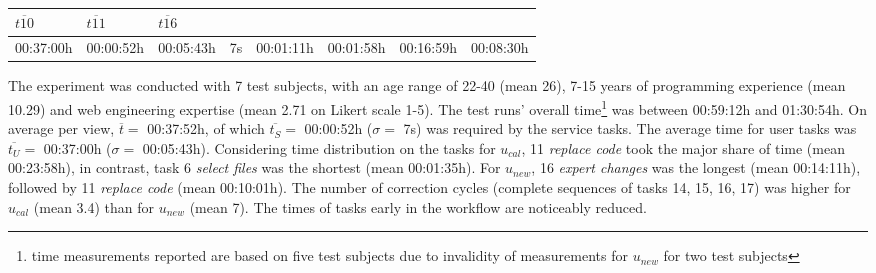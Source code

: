 \begin{longtable}[]{@{}llllllll@{}}
\begin{minipage}[b]{0.10\columnwidth}
\(\overline{t10}\)\strut
\end{minipage} & \begin{minipage}[b]{0.10\columnwidth}\raggedright
\(\overline{t11}\)\strut
\end{minipage} & \begin{minipage}[b]{0.10\columnwidth}\raggedright
\(\overline{t16}\)\strut
\end{minipage}\tabularnewline
\midrule
\endhead
\begin{minipage}[t]{0.10\columnwidth}\raggedright
00:37:00h\strut
\end{minipage} & \begin{minipage}[t]{0.10\columnwidth}\raggedright
00:00:52h\strut
\end{minipage} & \begin{minipage}[t]{0.08\columnwidth}\raggedright
00:05:43h\strut
\end{minipage} & \begin{minipage}[t]{0.08\columnwidth}\raggedright
7s\strut
\end{minipage} & \begin{minipage}[t]{0.10\columnwidth}\raggedright
00:01:11h\strut
\end{minipage} & \begin{minipage}[t]{0.10\columnwidth}\raggedright
00:01:58h\strut
\end{minipage} & \begin{minipage}[t]{0.10\columnwidth}\raggedright
00:16:59h\strut
\end{minipage} & \begin{minipage}[t]{0.10\columnwidth}\raggedright
00:08:30h\strut
\end{minipage}\tabularnewline
\bottomrule
\end{longtable}

The experiment was conducted with 7 test subjects, with an age range of 22-40 (mean 26), 7-15 years of programming experience (mean 10.29) and web engineering expertise (mean 2.71 on Likert scale 1-5).
The test runs' overall time\footnote{time measurements reported are based on five test subjects due to invalidity of measurements for \(u_{new}\) for two test subjects} was between 00:59:12h and 01:30:54h.
On average per view, \(\overline{t}=\) 00:37:52h, of which \(\overline{t_S}=\) 00:00:52h (\(\sigma =\) 7s) was required by the service tasks.
The average time for user tasks was \(\overline{t_U}=\) 00:37:00h (\(\sigma =\) 00:05:43h).
Considering time distribution on the tasks for \(u_{cal}\), 11 \emph{replace code} took the major share of time (mean 00:23:58h), in contrast, task 6 \emph{select files} was the shortest (mean 00:01:35h).
For \(u_{new}\), 16 \emph{expert changes} was the longest (mean 00:14:11h), followed by 11 \emph{replace code} (mean 00:10:01h).
The number of correction cycles (complete sequences of tasks 14, 15, 16, 17) was higher for \(u_{cal}\) (mean 3.4) than for \(u_{new}\) (mean 7).
The times of tasks early in the workflow are noticeably reduced.

